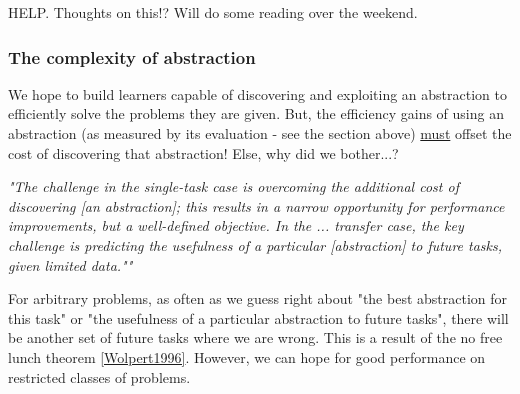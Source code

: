 
\cite{Allen-Zhu2016a,Johnson2013a}



{\color{red}HELP. Thoughts on this!? Will do some reading over the weekend.}

%
%
%

\subsubsection{The complexity of abstraction}

We hope to build learners capable of discovering and exploiting an abstraction
to efficiently solve the problems they are given.
But, the efficiency gains of using an abstraction (as measured by its evaluation - see the section above) \underline{must} offset the cost of
discovering that abstraction! Else, why did we bother...?

\begin{displayquote}
\textit{"The challenge in the single-task case is overcoming the additional cost of discovering [an abstraction];
this results in a narrow opportunity for performance improvements, but a well-defined objective.
In the ... transfer case, the key challenge is predicting the usefulness of a particular [abstraction] to future tasks, given limited data.""}\cite{Konidaris2019}
\end{displayquote}

For arbitrary problems, as often as we guess right about "the best abstraction for this task" or "the usefulness of a particular abstraction to future tasks",
there will be another set of future tasks where we are wrong. This is a result of the no free lunch theorem \ref{Wolpert1996}. However, we can hope for good performance on restricted classes of problems.

